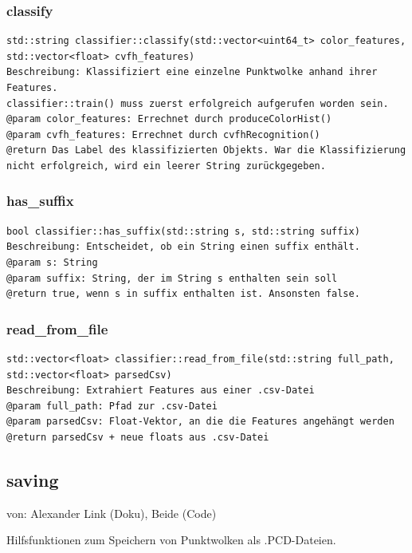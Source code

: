 \documentclass{suturo}
\makeatletter
\newcommand{\chapterauthor}[1]{%
  {\parindent0pt\vspace*{-27pt}%
  \linespread{0}\small\begin{flushright}von: #1\end{flushright}%
  \par\nobreak\vspace*{0pt}}
  \@afterheading%
}
\makeatother
\begin{document}
\subsubsection{classify}
\begin{verbatim}
std::string classifier::classify(std::vector<uint64_t> color_features,
std::vector<float> cvfh_features)
Beschreibung: Klassifiziert eine einzelne Punktwolke anhand ihrer Features.
classifier::train() muss zuerst erfolgreich aufgerufen worden sein.
@param color_features: Errechnet durch produceColorHist()
@param cvfh_features: Errechnet durch cvfhRecognition()
@return Das Label des klassifizierten Objekts. War die Klassifizierung
nicht erfolgreich, wird ein leerer String zurückgegeben.
\end{verbatim}\label{func:classify}

\subsubsection{has\_suffix}
\begin{verbatim}
bool classifier::has_suffix(std::string s, std::string suffix)
Beschreibung: Entscheidet, ob ein String einen suffix enthält.
@param s: String
@param suffix: String, der im String s enthalten sein soll
@return true, wenn s in suffix enthalten ist. Ansonsten false.
\end{verbatim}\label{func:hassuffix}

\subsubsection{read\_from\_file}
\begin{verbatim}
std::vector<float> classifier::read_from_file(std::string full_path, 
std::vector<float> parsedCsv)
Beschreibung: Extrahiert Features aus einer .csv-Datei
@param full_path: Pfad zur .csv-Datei
@param parsedCsv: Float-Vektor, an die die Features angehängt werden
@return parsedCsv + neue floats aus .csv-Datei
\end{verbatim}\label{func:readfromfile}


\subsection*{saving}
\chapterauthor{Alexander Link (Doku), Beide (Code)}
Hilfsfunktionen zum Speichern von Punktwolken als .PCD-Dateien.
\end{document}

